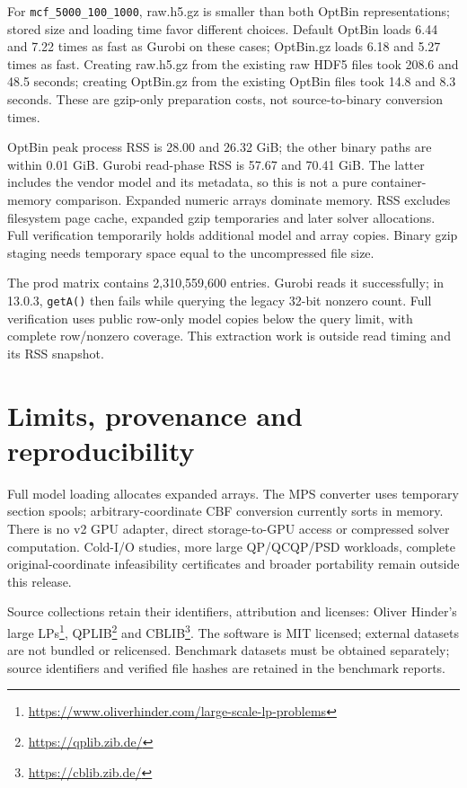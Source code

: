 \documentclass[10pt]{article}
\begin{document}
For \texttt{mcf\_5000\_100\_1000}, raw.h5.gz is smaller than both OptBin representations; stored size and loading time favor different choices. Default OptBin loads 6.44 and 7.22 times as fast as Gurobi on these cases; OptBin.gz loads 6.18 and 5.27 times as fast. Creating raw.h5.gz from the existing raw HDF5 files took 208.6 and 48.5 seconds; creating OptBin.gz from the existing OptBin files took 14.8 and 8.3 seconds. These are gzip-only preparation costs, not source-to-binary conversion times.

OptBin peak process RSS is 28.00 and 26.32 GiB; the other binary paths are within 0.01 GiB. Gurobi read-phase RSS is 57.67 and 70.41 GiB. The latter includes the vendor model and its metadata, so this is not a pure container-memory comparison. Expanded numeric arrays dominate memory. RSS excludes filesystem page cache, expanded gzip temporaries and later solver allocations. Full verification temporarily holds additional model and array copies. Binary gzip staging needs temporary space equal to the uncompressed file size.

The prod matrix contains 2,310,559,600 entries. Gurobi reads it successfully; in 13.0.3, \texttt{getA()} then fails while querying the legacy 32-bit nonzero count. Full verification uses public row-only model copies below the query limit, with complete row/nonzero coverage. This extraction work is outside read timing and its RSS snapshot.

\clearpage
\section{Limits, provenance and reproducibility}
Full model loading allocates expanded arrays. The MPS converter uses temporary
section spools; arbitrary-coordinate CBF conversion currently sorts in memory.
There is no v2 GPU adapter, direct storage-to-GPU access or compressed solver
computation. Cold-I/O studies, more large QP/QCQP/PSD workloads, complete
original-coordinate infeasibility certificates and broader portability remain
outside this release.

Source collections retain their identifiers, attribution and licenses:
Oliver Hinder's large LPs\footnote{\url{https://www.oliverhinder.com/large-scale-lp-problems}},
QPLIB\footnote{\url{https://qplib.zib.de/}} and
CBLIB\footnote{\url{https://cblib.zib.de/}}.
The software is MIT licensed; external datasets are not bundled or relicensed.
Benchmark datasets must be obtained separately; source identifiers and verified
file hashes are retained in the benchmark reports.
\end{document}
